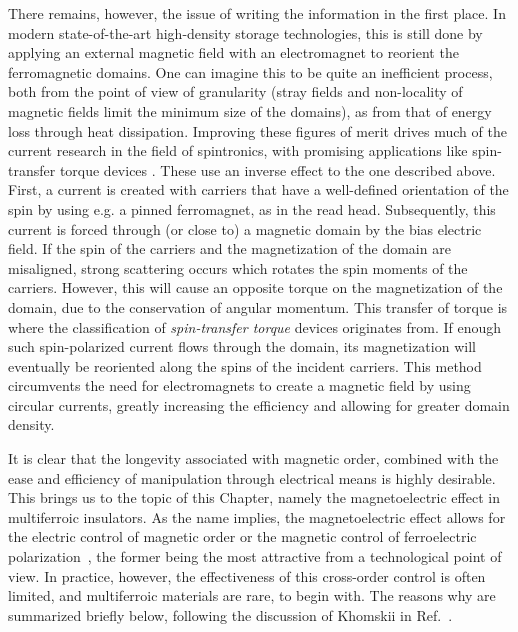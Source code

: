 There remains, however, the issue of writing the information in the first place.
In modern state-of-the-art high-density storage technologies, this is still done by applying an external magnetic field with an electromagnet to reorient the ferromagnetic domains. One can imagine this to be quite an inefficient process, both from the point of view of granularity (stray fields and non-locality of magnetic fields limit the minimum size of the domains), as from that of energy loss through heat dissipation.
Improving these figures of merit drives much of the current research in the field of spintronics, with promising applications like spin-transfer torque devices \cite{Nunez2006TheorySemiconductors,Nunez2006TheoryMetals,Nunez2011, Kent2015, Jungwirth2016}.
These use an inverse effect to the one described above.
First, a current is created with carriers that have a well-defined orientation of the spin by using e.g. a pinned ferromagnet, as in the read head.
Subsequently, this current is forced through (or close to) a magnetic domain by the bias electric field.
If the spin of the carriers and the magnetization of the domain are misaligned, strong scattering occurs which rotates the spin moments of the carriers.
However, this will cause an opposite torque on the magnetization of the domain, due to the conservation of angular momentum. This transfer of torque is where the classification of {\it spin-transfer torque} devices originates from.
If enough such spin-polarized current flows through the domain, its magnetization will eventually be reoriented along the spins of the incident carriers. This method circumvents the need for electromagnets to create a magnetic field by using circular currents, greatly increasing the efficiency and allowing for greater domain density.

It is clear that the longevity associated with magnetic order, combined with the ease and efficiency of manipulation through electrical means is highly desirable.
This brings us to the topic of this Chapter, namely the magnetoelectric effect in multiferroic insulators.
As the name implies, the magnetoelectric effect allows for the electric control of magnetic order or the magnetic control of ferroelectric polarization~\cite{Spaldin2019,Khomskii2009,Fiebig2005,Fiebig2016,Cheong2007}, the former being the most attractive from a technological point of view.
In practice, however, the effectiveness of this cross-order control is often limited, and multiferroic materials are rare, to begin with.
The reasons why are summarized briefly below, following the discussion of Khomskii in Ref.~\cite{Khomskii2009}.


